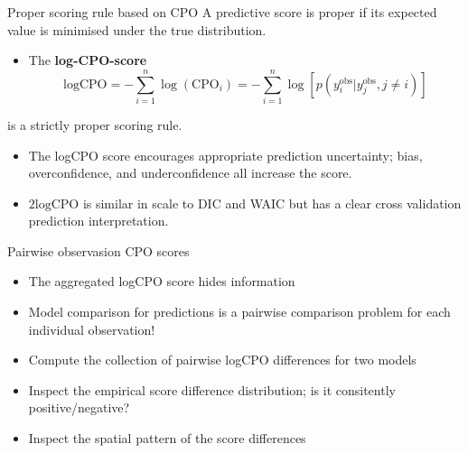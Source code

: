 \documentclass[
  ignorenonframetext,
  handout]{beamer}
\providecommand{\tightlist}{%
  \setlength{\itemsep}{0pt}\setlength{\parskip}{0pt}}
\begin{document}
\begin{frame}{Proper scoring rule based on CPO}
\protect\hypertarget{proper-scoring-rule-based-on-cpo}{}
A predictive score is proper if its expected value is minimised under
the true distribution.

\begin{itemize}
\tightlist
\item
  The \textbf{log-CPO-score} \[
  \text{logCPO} = -\sum_{i = 1}^n\log(\text{CPO}_i)  = -\sum_{i = 1}^n\log[p(y_i^{\text{obs}}|y_j^\text{obs}, j\neq i)]
  \]
\end{itemize}

is a strictly proper scoring rule.

\begin{itemize}
\item
  The logCPO score encourages appropriate prediction uncertainty; bias,
  overconfidence, and underconfidence all increase the score.
\item
  \(2\text{logCPO}\) is similar in scale to DIC and WAIC but has a clear
  cross validation prediction interpretation.
\end{itemize}
\end{frame}

\begin{frame}{Pairwise observasion CPO scores}
\protect\hypertarget{pairwise-observasion-cpo-scores}{}
\begin{itemize}
\item
  The aggregated logCPO score hides information
\item
  Model comparison for predictions is a pairwise comparison problem for
  each individual observation!
\item
  Compute the collection of pairwise logCPO differences for two models
\item
  Inspect the empirical score difference distribution; is it consitently
  positive/negative?
\item
  Inspect the spatial pattern of the score differences
\end{itemize}
\end{frame}
\end{document}
